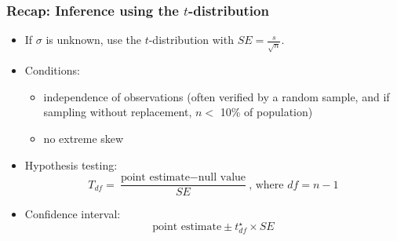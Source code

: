 
\begin{frame}
\frametitle{Recap: Inference using the $t$-distribution}

\begin{itemize}

\item If $\sigma$ is unknown, use the $t$-distribution with $SE = \frac{s}{\sqrt{n}}$.

\pause

\item Conditions: 
\begin{itemize}
\item independence of observations (often verified by a random sample, and if sampling without replacement, $n < $ 10\% of population)
\item no extreme skew
\end{itemize}

\pause

\item Hypothesis testing: 
\[ T_{df} = \frac{\text{point estimate} - \text{null value}}{SE}\text{, where }df = n - 1 \]

\pause

\item Confidence interval:
\[ \text{point estimate} \pm t_{df}^\star \times SE \]

\end{itemize}

\pause


\end{frame}

